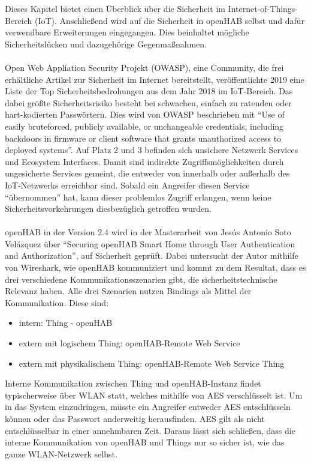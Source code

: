 Dieses Kapitel bietet einen Überblick über die Sicherheit im Internet-of-Things-Bereich (IoT).  Anschließend wird auf die Sicherheit in openHAB selbst und dafür verwendbare Erweiterungen eingegangen. Dies beinhaltet mögliche Sicherheitslücken und dazugehörige Gegenmaßnahmen.\\
\\
Open Web Appliation Security Projekt (OWASP), eine Community, die frei erhältliche Artikel zur Sicherheit im Internet bereitstellt, veröffentlichte 2019 eine Liste der Top Sicherheitsbedrohungen aus dem Jahr 2018 im IoT-Bereich.\cite{OWASP01:IOT} Das dabei größte Sicherheitsrisiko besteht bei schwachen, einfach zu ratenden oder hart-kodierten Passwörtern. Dies wird von OWASP beschrieben mit "`Use of easily bruteforced, publicly available, or unchangeable credentials, including backdoors in firmware or client software that grants unauthorized access to deployed systems"'.\cite{OWASP01:IOT} Auf Platz 2 und 3 befinden sich unsichere Netzwerk Services und Ecosystem Interfaces. Damit sind indirekte Zugriffsmöglichkeiten durch ungesicherte Services gemeint, die entweder von innerhalb oder außerhalb des IoT-Netzwerks erreichbar sind. Sobald ein Angreifer diesen Service "`übernommen"' hat, kann dieser problemlos Zugriff erlangen, wenn keine Sicherheitsvorkehrungen diesbezüglich getroffen wurden.\\
\\
openHAB in der Version 2.4 wird in der Masterarbeit von Jesús Antonio Soto Velázquez über "`Securing openHAB Smart Home through User Authentication and Authorization"', auf Sicherheit geprüft.\cite{MA01:OPH} Dabei untersucht der Autor mithilfe von Wireshark, wie openHAB kommuniziert und kommt zu dem Resultat, dass es drei verschiedene Kommunikationsszenarien gibt, die sicherheitstechnische Relevanz haben. Alle drei Szenarien nutzen Bindings als Mittel der Kommunikation. Diese sind:
\begin{itemize}
	\item intern: Thing - openHAB
	\item extern mit logischem Thing: openHAB-Remote Web Service
	\item extern mit physikalischem Thing: openHAB-Remote Web Service Thing
\end{itemize}	
Interne Kommunikation zwischen Thing und openHAB-Instanz findet typischerweise über WLAN statt, welches mithilfe von AES verschlüsselt ist. Um in das System einzudringen, müsste ein Angreifer entweder AES entschlüsseln können oder das Passwort anderweitig herausfinden. AES gilt als nicht entschlüsselbar in einer annehmbaren Zeit. Daraus lässt sich schließen, dass die interne Kommunikation von openHAB und Things nur so sicher ist, wie das ganze WLAN-Netzwerk selbst.\\
